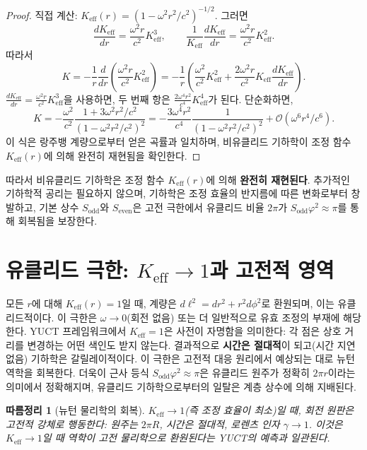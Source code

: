 \documentclass[12pt,a4paper]{article}
\newtheorem{corollary}{따름정리}[section]
\newcommand{\Sodd}{S_{\mathrm{odd}}}
\newcommand{\Seven}{S_{\mathrm{even}}}
\begin{document}
	\begin{proof}
		직접 계산: \(K_{\mathrm{eff}}(r) = (1 - \omega^2 r^2/c^2)^{-1/2}\). 그러면
		\[
		\frac{dK_{\mathrm{eff}}}{dr} = \frac{\omega^2 r}{c^2} K_{\mathrm{eff}}^3,\qquad
		\frac{1}{K_{\mathrm{eff}}} \frac{dK_{\mathrm{eff}}}{dr} = \frac{\omega^2 r}{c^2} K_{\mathrm{eff}}^2.
		\]
		따라서
		\[
		K = -\frac{1}{r} \frac{d}{dr}\left( \frac{\omega^2 r}{c^2} K_{\mathrm{eff}}^2 \right) = -\frac{1}{r} \left( \frac{\omega^2}{c^2} K_{\mathrm{eff}}^2 + \frac{2\omega^2 r}{c^2} K_{\mathrm{eff}} \frac{dK_{\mathrm{eff}}}{dr} \right).
		\]
		\(\frac{dK_{\mathrm{eff}}}{dr} = \frac{\omega^2 r}{c^2} K_{\mathrm{eff}}^3\)을 사용하면, 두 번째 항은 \(\frac{2\omega^4 r^2}{c^4} K_{\mathrm{eff}}^4\)가 된다. 단순화하면,
		\[
		K = -\frac{\omega^2}{c^2} \frac{1 + 3\omega^2 r^2/c^2}{(1 - \omega^2 r^2/c^2)^2} = -\frac{3\omega^4 r^2}{c^4} \frac{1}{(1 - \omega^2 r^2/c^2)^2} + \mathcal{O}(\omega^6 r^4/c^6).
		\]
		이 식은 랑주뱅 계량으로부터 얻은 곡률과 일치하며, 비유클리드 기하학이 조정 함수 \(K_{\mathrm{eff}}(r)\)에 의해 완전히 재현됨을 확인한다.
	\end{proof}
	
	따라서 비유클리드 기하학은 조정 함수 \(K_{\mathrm{eff}}(r)\)에 의해 \textbf{완전히 재현된다}. 추가적인 기하학적 공리는 필요하지 않으며, 기하학은 조정 효율의 반지름에 따른 변화로부터 창발하고, 기본 상수 \(\Sodd\)와 \(\Seven\)은 고전 극한에서 유클리드 비율 \(2\pi\)가 \(\Sodd \varphi^2 \approx \pi\)를 통해 회복됨을 보장한다.
	
	\section{유클리드 극한: \(K_{\mathrm{eff}} \to 1\)과 고전적 영역}
	\label{sec:euc-limit}
	
	모든 \(r\)에 대해 \(K_{\mathrm{eff}}(r) = 1\)일 때, 계량은 \(d\ell^2 = dr^2 + r^2 d\phi^2\)로 환원되며, 이는 유클리드적이다. 이 극한은 \(\omega \to 0\)(회전 없음) 또는 더 일반적으로 유효 조정의 부재에 해당한다. YUCT 프레임워크에서 \(K_{\mathrm{eff}} = 1\)은 사전이 자명함을 의미한다: 각 점은 상호 거리를 변경하는 어떤 색인도 받지 않는다. 결과적으로 \textbf{시간은 절대적}이 되고(시간 지연 없음) 기하학은 갈릴레이적이다. 이 극한은 고전적 대응 원리에서 예상되는 대로 뉴턴 역학을 회복한다. 더욱이 근사 등식 \(\Sodd \varphi^2 \approx \pi\)은 유클리드 원주가 정확히 \(2\pi r\)이라는 의미에서 정확해지며, 유클리드 기하학으로부터의 일탈은 계층 상수에 의해 지배된다.
	
	\begin{corollary}[뉴턴 물리학의 회복]
		\(K_{\mathrm{eff}} \to 1\)(즉 조정 효율이 최소)일 때, 회전 원판은 고전적 강체로 행동한다: 원주는 \(2\pi R\), 시간은 절대적, 로렌츠 인자 \(\gamma \to 1\). 이것은 \(K_{\mathrm{eff}} \to 1\)일 때 역학이 고전 물리학으로 환원된다는 YUCT의 예측과 일관된다.
	\end{corollary}
	
\end{document}
